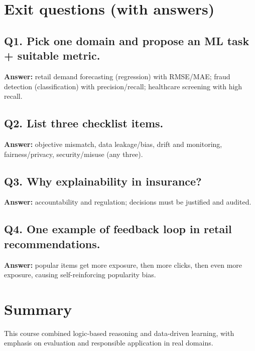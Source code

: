 \documentclass[11pt]{article}
\begin{document}
\section{Exit questions (with answers)}

\subsection*{Q1. Pick one domain and propose an ML task + suitable metric.}
\textbf{Answer:} retail demand forecasting (regression) with RMSE/MAE; fraud detection (classification) with precision/recall; healthcare screening with high recall.

\subsection*{Q2. List three checklist items.}
\textbf{Answer:} objective mismatch, data leakage/bias, drift and monitoring, fairness/privacy, security/misuse (any three).

\subsection*{Q3. Why explainability in insurance?}
\textbf{Answer:} accountability and regulation; decisions must be justified and audited.

\subsection*{Q4. One example of feedback loop in retail recommendations.}
\textbf{Answer:} popular items get more exposure, then more clicks, then even more exposure, causing self-reinforcing popularity bias.

\section{Summary}
This course combined logic-based reasoning and data-driven learning, with emphasis on evaluation and responsible application in real domains.
\notesources{\AIMLUnitVSources}
\end{document}
